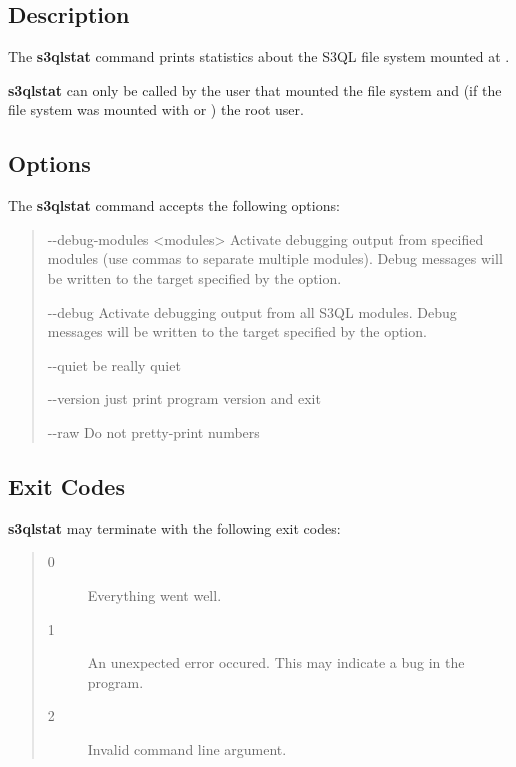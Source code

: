 \documentclass[letterpaper,10pt,english]{sphinxmanual}
\begin{document}
\subsection{Description}
\label{man/stat:description}
The \textbf{s3qlstat} command prints statistics about the S3QL file system mounted
at .

\textbf{s3qlstat} can only be called by the user that mounted the file system
and (if the file system was mounted with  or
) the root user.


\subsection{Options}
\label{man/stat:options}
The \textbf{s3qlstat} command accepts the following options:
\begin{quote}
\begin{optionlist}{3cm}
\item [-{-}debug-modules \textless{}modules\textgreater{}]  
Activate debugging output from specified modules (use
commas to separate multiple modules). Debug messages
will be written to the target specified by the
 option.
\item [-{-}debug]  
Activate debugging output from all S3QL modules. Debug
messages will be written to the target specified by
the  option.
\item [-{-}quiet]  
be really quiet
\item [-{-}version]  
just print program version and exit
\item [-{-}raw]  
Do not pretty-print numbers
\end{optionlist}
\end{quote}


\subsection{Exit Codes}
\label{man/stat:exit-codes}
\textbf{s3qlstat} may terminate with the following exit codes:
\begin{quote}\begin{description}
\item[{0}] \leavevmode
Everything went well.

\item[{1}] \leavevmode
An unexpected error occured. This may indicate a bug in the
program.

\item[{2}] \leavevmode
Invalid command line argument.

\end{description}\end{quote}
\end{document}
